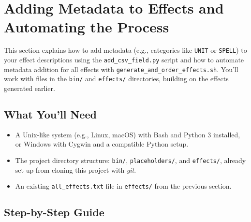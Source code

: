 \section{Adding Metadata to Effects and Automating the Process}

This section explains how to add metadata (e.g., categories like \texttt{UNIT} or \texttt{SPELL}) to your effect descriptions using the \texttt{add\_csv\_field.py} script and how to automate metadata addition for all effects with \texttt{generate\_and\_order\_effects.sh}. You’ll work with files in the \texttt{bin/} and \texttt{effects/} directories, building on the effects generated earlier.

\subsection{What You’ll Need}
\begin{itemize}
	\item A Unix-like system (e.g., Linux, macOS) with Bash and Python 3 installed, or Windows with Cygwin and a compatible Python setup.
	\item The project directory structure: \texttt{bin/}, \texttt{placeholders/}, and \texttt{effects/}, already set up from cloning this project with \textit{git}.
	\item An existing \texttt{all\_effects.txt} file in \texttt{effects/} from the previous section.
\end{itemize}

\subsection{Step-by-Step Guide}


